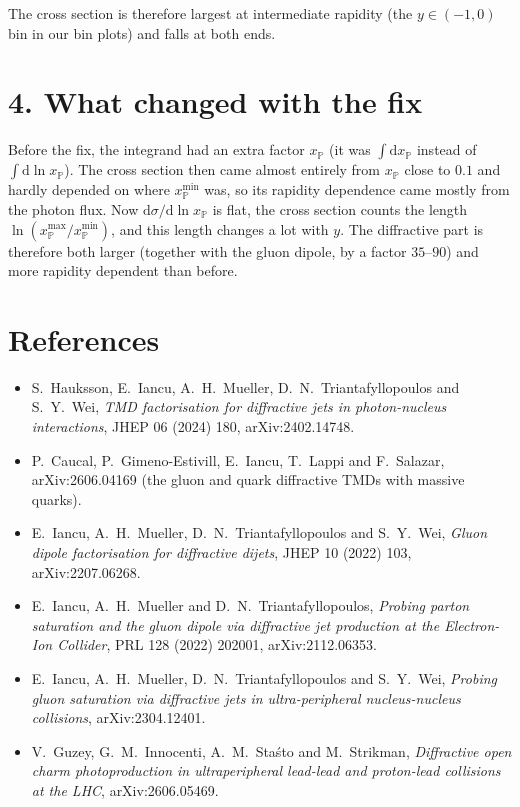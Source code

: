 \documentclass[12pt]{article}
\newcommand{\xpo}{x_{\mathbb{P}}}
\begin{document}
The cross section is therefore largest at intermediate rapidity (the $y\in(-1,0)$ bin in our bin
plots) and falls at both ends.

\section*{4. What changed with the fix}

Before the fix, the integrand had an extra factor $\xpo$ (it was $\int\mathrm{d}\xpo$ instead of
$\int\mathrm{d}\ln\xpo$). The cross section then came almost entirely from $\xpo$ close to $0.1$ and
hardly depended on where $\xpo^{\min}$ was, so its rapidity dependence came mostly from the photon
flux. Now $\mathrm{d}\sigma/\mathrm{d}\ln\xpo$ is flat, the cross section counts the length
$\ln(\xpo^{\max}/\xpo^{\min})$, and this length changes a lot with $y$. The diffractive part is
therefore both larger (together with the gluon dipole, by a factor $35$--$90$) and more rapidity
dependent than before.

\section*{References}
\begin{itemize}
\item[{[2]}] S.~Hauksson, E.~Iancu, A.~H.~Mueller, D.~N.~Triantafyllopoulos and S.~Y.~Wei,
  \emph{TMD factorisation for diffractive jets in photon-nucleus interactions},
  JHEP 06 (2024) 180, arXiv:2402.14748.
\item[{[3]}] P.~Caucal, P.~Gimeno-Estivill, E.~Iancu, T.~Lappi and F.~Salazar,
  arXiv:2606.04169 (the gluon and quark diffractive TMDs with massive quarks).
\item E.~Iancu, A.~H.~Mueller, D.~N.~Triantafyllopoulos and S.~Y.~Wei, \emph{Gluon dipole
  factorisation for diffractive dijets}, JHEP 10 (2022) 103, arXiv:2207.06268.
\item E.~Iancu, A.~H.~Mueller and D.~N.~Triantafyllopoulos, \emph{Probing parton saturation and the
  gluon dipole via diffractive jet production at the Electron-Ion Collider}, PRL 128 (2022) 202001,
  arXiv:2112.06353.
\item E.~Iancu, A.~H.~Mueller, D.~N.~Triantafyllopoulos and S.~Y.~Wei, \emph{Probing gluon
  saturation via diffractive jets in ultra-peripheral nucleus-nucleus collisions}, arXiv:2304.12401.
\item V.~Guzey, G.~M.~Innocenti, A.~M.~Sta\'sto and M.~Strikman, \emph{Diffractive open charm
  photoproduction in ultraperipheral lead-lead and proton-lead collisions at the LHC},
  arXiv:2606.05469.
\end{itemize}
\end{document}

